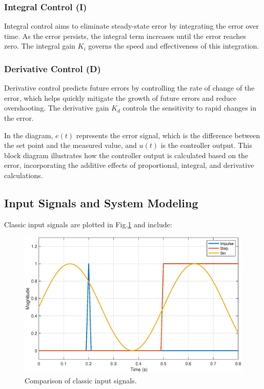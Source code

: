 \documentclass[journal,twoside,web]{ieeecolor}
\begin{document}
\subsubsection{Integral Control (I)}
{Integral control aims to eliminate steady-state error by integrating the error over time. As the error persists, the integral term increases until the error reaches zero. The integral gain \( K_i \) governs the speed and effectiveness of this integration.}

\subsubsection{Derivative Control (D)}
{Derivative control predicts future errors by controlling the rate of change of the error, which helps quickly mitigate the growth of future errors and reduce overshooting. The derivative gain \( K_d \) controls the sensitivity to rapid changes in the error.}


In the diagram, \( e(t) \) represents the error signal, which is the difference between the set point and the measured value, and \( u(t) \) is the controller output. This block diagram illustrates how the controller output is calculated based on the error, incorporating the additive effects of proportional, integral, and derivative calculations.


\subsection{Input Signals and System Modeling}
Classic input signals are plotted in Fig.\ref{input} and include:

\begin{figure}[!t]
\centerline{\includegraphics[width=\columnwidth]{Images/input.eps}}
\caption{Comparison of classic input signals.}
\label{input}
\end{figure}
\end{document}

